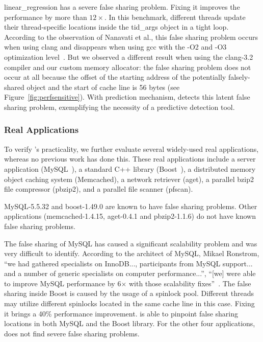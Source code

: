 linear\_regression has a severe false sharing problem. Fixing it improves the performance by more than $12\times$. In this benchmark, different threads update their thread-specific locations inside the tid\_args object in a tight loop. According to the observation of Nanavati et al., this false sharing problem occurs when using clang and disappears when using gcc with the -O2 and -O3 optimization level~\cite{OSdetection}. But we observed a different result when using the clang-3.2 compiler and our custom memory allocator: the false sharing problem does not occur at all because the offset of the starting address of the potentially falsely-shared object and the start of cache line is 56 bytes (see Figure~\ref{fig:perfsensitive}). With prediction mechanism, \Predator{} detects this latent false sharing problem, exemplifying the necessity of a predictive detection tool. 

\subsubsection{Real Applications}
To verify \Predator{}'s practicality, we further evaluate several widely-used real applications, whereas no previous work has done this. These real applications include a server application (MySQL~\cite{mysql}),
a standard C++ library (Boost~\cite{libfalsesharing}),
a distributed memory object caching system (Memcached), a network retriever (aget),
a parallel bzip2 file compressor (pbzip2), and a parallel file scanner (pfscan).

MySQL-5.5.32 and boost-1.49.0 are known to have false sharing problems. Other applications (memcached-1.4.15, aget-0.4.1 and pbzip2-1.1.6) do not have known false sharing problems.

The false sharing of MySQL has caused a significant scalability problem and was very difficult to identify.
According to the architect of MySQL, Mikael Ronstrom, ``we had gathered specialists on InnoDB..., participants from MySQL support... and a number of generic specialists on 
computer performance...'', ``[we] were able to improve MySQL performance by 6$\times$ with those scalability fixes''~\cite{mysql}. 
The false sharing inside Boost is caused by the usage of a  spinlock pool. Different threads may utilize different spinlocks located in the same cache line in this case. Fixing it brings a 40\% performance improvement.
\Predator{} is able to pinpoint false sharing locations in both MySQL and the Boost library. 
For the other four applications, \Predator{} does not find severe false sharing problems.


